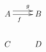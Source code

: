 \documentclass{article}
\begin{document}
\[
\xymatrix{
A \ar[r]_>> > ><<<(.2){f} \ar@<1ex>[r] ^>>>{g} & B \\ C & D
}
\]
\end{document}
